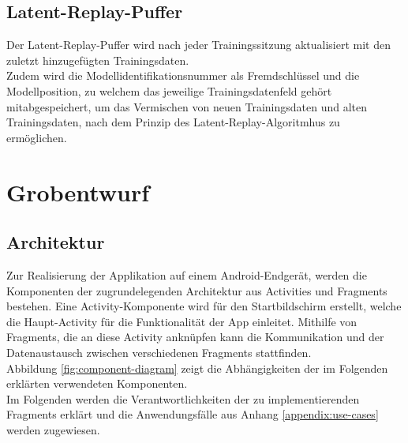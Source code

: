\documentclass[oneside]{ausarbeitung}
\begin{document}
\subsection{Latent-Replay-Puffer}
Der Latent-Replay-Puffer wird nach jeder Trainingssitzung aktualisiert mit den zuletzt hinzugefügten Trainingsdaten.\\
Zudem wird die Modellidentifikationsnummer als Fremdschlüssel und die Modellposition, zu welchem das jeweilige Trainingsdatenfeld gehört mitabgespeichert, um das Vermischen von neuen Trainingsdaten und alten Trainingsdaten, nach dem Prinzip des Latent-Replay-Algoritmhus zu ermöglichen.
\section{Grobentwurf}

\subsection{Architektur}
Zur Realisierung der Applikation auf einem Android-Endgerät, werden die Komponenten der zugrundelegenden Architektur aus Activities und Fragments bestehen. Eine Activity-Komponente wird für den Startbildschirm erstellt, welche die Haupt-Activity für die Funktionalität der App einleitet. Mithilfe von Fragments, die an diese Activity anknüpfen kann die Kommunikation und der Datenaustausch zwischen verschiedenen Fragments stattfinden.\\
Abbildung \ref{fig:component-diagram} zeigt die Abhängigkeiten der im Folgenden erklärten verwendeten Komponenten.\\
Im Folgenden werden die Verantwortlichkeiten der zu implementierenden Fragments erklärt und die Anwendungsfälle aus Anhang \ref{appendix:use-cases} werden zugewiesen.
\end{document}
